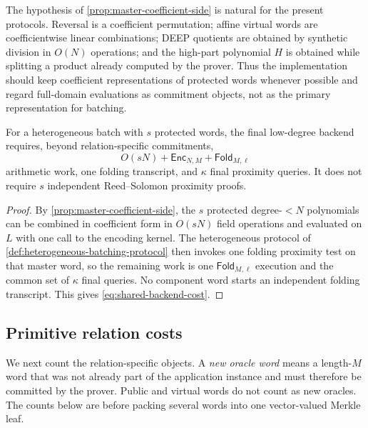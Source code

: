 The hypothesis of \cref{prop:master-coefficient-side} is natural for the present protocols.  Reversal is a coefficient permutation; affine virtual words are coefficientwise linear combinations; DEEP quotients are obtained by synthetic division in $O(N)$ operations; and the high-part polynomial $H$ is obtained while splitting a product already computed by the prover.  Thus the implementation should keep coefficient representations of protected words whenever possible and regard full-domain evaluations as commitment objects, not as the primary representation for batching.

\begin{corollary}
\label{cor:backend-sharing}
For a heterogeneous batch with $s$ protected words, the final low-degree backend requires, beyond relation-specific commitments,
\begin{equation}
  O(sN)+\mathsf{Enc}_{N,M}+\mathsf{Fold}_{M,\ell}
  \label{eq:shared-backend-cost}
\end{equation}
arithmetic work, one folding transcript, and $\kappa$ final proximity queries.  It does not require $s$ independent Reed--Solomon proximity proofs.
\end{corollary}

\begin{proof}
By \cref{prop:master-coefficient-side}, the $s$ protected degree-$<N$ polynomials can be combined in coefficient form in $O(sN)$ field operations and evaluated on $L$ with one call to the encoding kernel.  The heterogeneous protocol of \cref{def:heterogeneous-batching-protocol} then invokes one folding proximity test on that master word, so the remaining work is one $\mathsf{Fold}_{M,\ell}$ execution and the common set of $\kappa$ final queries.  No component word starts an independent folding transcript.  This gives \eqref{eq:shared-backend-cost}.
\end{proof}

\subsection{Primitive relation costs}
\label{sec:complexity-primitives}

We next count the relation-specific objects.  A \emph{new oracle word} means a length-$M$ word that was not already part of the application instance and must therefore be committed by the prover.  Public and virtual words do not count as new oracles.  The counts below are before packing several words into one vector-valued Merkle leaf.

